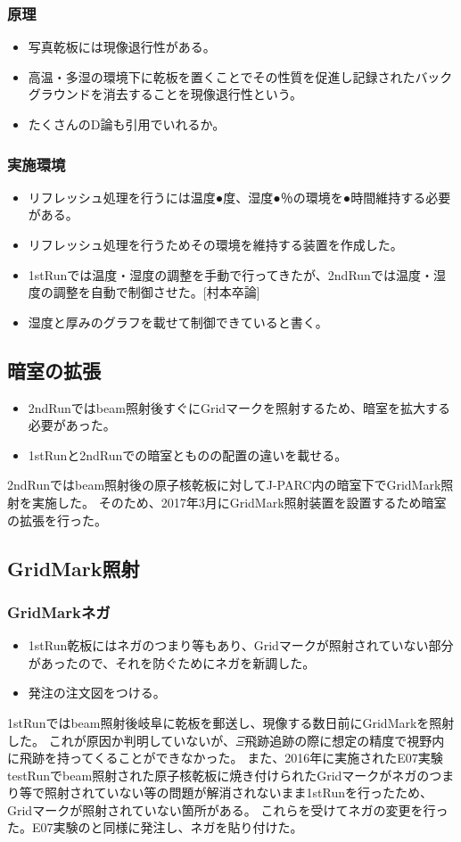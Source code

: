 \documentclass[12pt,a4paper]{jarticle}
\begin{document}
\subsubsection{原理}
\begin{itemize}
 \item 写真乾板には現像退行性がある。
 \item 高温・多湿の環境下に乾板を置くことでその性質を促進し記録されたバックグラウンドを消去することを現像退行性という。
 \item たくさんのD論も引用でいれるか。
\end{itemize}
\subsubsection{実施環境}
\begin{itemize}
 \item リフレッシュ処理を行うには温度●度、湿度●％の環境を●時間維持する必要がある。
 \item リフレッシュ処理を行うためその環境を維持する装置を作成した。
 \item 1stRunでは温度・湿度の調整を手動で行ってきたが、2ndRunでは温度・湿度の調整を自動で制御させた。[村本卒論]
 \item 湿度と厚みのグラフを載せて制御できていると書く。
\end{itemize}
\subsection{暗室の拡張}
\begin{itemize}
 \item 2ndRunではbeam照射後すぐにGridマークを照射するため、暗室を拡大する必要があった。
 \item 1stRunと2ndRunでの暗室とものの配置の違いを載せる。
\end{itemize}
2ndRunではbeam照射後の原子核乾板に対してJ-PARC内の暗室下でGridMark照射を実施した。
そのため、2017年3月にGridMark照射装置を設置するため暗室の拡張を行った。
\par
\subsection{GridMark照射}
\subsubsection{GridMarkネガ}
\begin{itemize}
 \item 1stRun乾板にはネガのつまり等もあり、Gridマークが照射されていない部分があったので、それを防ぐためにネガを新調した。
 \item 発注の注文図をつける。
\end{itemize}
1stRunではbeam照射後岐阜に乾板を郵送し、現像する数日前にGridMarkを照射した。
これが原因か判明していないが、$\Xi$飛跡追跡の際に想定の精度で視野内に飛跡を持ってくることができなかった。
また、2016年に実施されたE07実験testRunでbeam照射された原子核乾板に焼き付けられたGridマークがネガのつまり等で照射されていない等の問題が解消されないまま1stRunを行ったため、Gridマークが照射されていない箇所がある。
これらを受けてネガの変更を行った。E07実験のと同様に発注し、ネガを貼り付けた。
\end{document}
